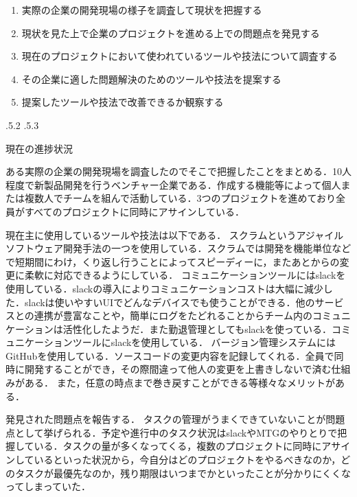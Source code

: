 \documentclass[uplatex]{jsarticle}
\makeatletter
\renewcommand{\section}{%
    \if@slide\clearpage\fi
    \@startsection{section}{1}{\z@}%
    {\Cvs \@plus.5\Cdp \@minus.2\Cdp}%
    {.5\Cvs \@plus.3\Cdp}%
    {\normalfont\raggedright}}
\makeatother
\begin{document}
\begin{enumerate}
\item 実際の企業の開発現場の様子を調査して現状を把握する
\item 現状を見た上で企業のプロジェクトを進める上での問題点を発見する
\item 現在のプロジェクトにおいて使われているツールや技法について調査する
\item その企業に適した問題解決のためのツールや技法を提案する
\item 提案したツールや技法で改善できるか観察する
\end{enumerate}



\section{現在の進捗状況}

ある実際の企業の開発現場を調査したのでそこで把握したことをまとめる．10人程度で新製品開発を行うベンチャー企業である．作成する機能等によって個人または複数人でチームを組んで活動している．3つのプロジェクトを進めており全員がすべてのプロジェクトに同時にアサインしている．

現在主に使用しているツールや技法は以下である．
スクラムというアジャイルソフトウェア開発手法の一つを使用している．\cite{nagase2012}スクラムでは開発を機能単位などで短期間にわけ，くり返し行うことによってスピーディーに，またあとからの変更に柔軟に対応できるようにしている．
コミュニケーションツールにはslackを使用している．slackの導入によりコミュニケーションコストは大幅に減少した．slackは使いやすいUIでどんなデバイスでも使うことができる．他のサービスとの連携が豊富なことや，簡単にログをたどれることからチーム内のコミュニケーションは活性化したようだ．また勤退管理としてもslackを使っている．コミュニケーションツールにslackを使用している．
バージョン管理システムにはGitHubを使用している．ソースコードの変更内容を記録してくれる．全員で同時に開発することができ，その際間違って他人の変更を上書きしないで済む仕組みがある．
また，任意の時点まで巻き戻すことができる等様々なメリットがある．

発見された問題点を報告する．
タスクの管理がうまくできていないことが問題点として挙げられる．予定や進行中のタスク状況はslackやMTGのやりとりで把握している．タスクの量が多くなってくる，複数のプロジェクトに同時にアサインしているといった状況から，今自分はどのプロジェクトをやるべきなのか，どのタスクが最優先なのか，残り期限はいつまでかといったことが分かりにくくなってしまっていた．
\end{document}
